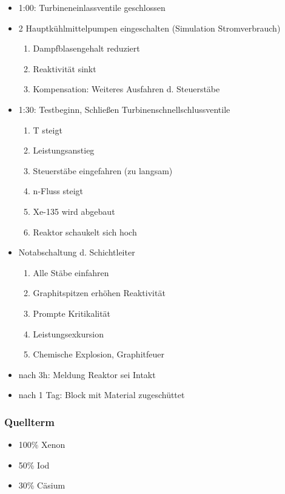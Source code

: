 \documentclass[12pt]{article}
\begin{document}
\begin{itemize}
	\item 1:00: Turbineneinlassventile geschlossen
	\item 2 Hauptkühlmittelpumpen eingeschalten (Simulation Stromverbrauch)
		\begin{enumerate}[label = \textrightarrow]
			\item Dampfblasengehalt reduziert
			\item Reaktivität sinkt
			\item Kompensation: Weiteres Ausfahren d. Steuerstäbe
		\end{enumerate}
	\item 1:30: Testbeginn, Schließen Turbinenschnellschlussventile
		\begin{enumerate}[label = \textrightarrow]
			\item T steigt
			\item Leistungsanstieg
			\item Steuerstäbe eingefahren (zu langsam)
			\item n-Fluss steigt
			\item Xe-135 wird abgebaut
			\item Reaktor schaukelt sich hoch
		\end{enumerate}
	\item Notabschaltung d. Schichtleiter
		\begin{enumerate}[label = \textrightarrow]
			\item Alle Stäbe einfahren
			\item Graphitspitzen erhöhen Reaktivität
			\item Prompte Kritikalität
			\item Leistungsexkursion
			\item Chemische Explosion, Graphitfeuer
		\end{enumerate}
	\item nach 3h: Meldung Reaktor sei Intakt
	\item nach 1 Tag: Block mit Material zugeschüttet

\end{itemize}

\subsubsection{Quellterm}
\begin{itemize}
	\item 100\% Xenon
	\item 50\% Iod
	\item 30\% Cäsium
\end{itemize}
\end{document}
